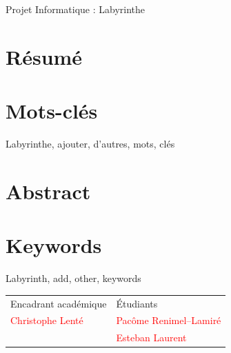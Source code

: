 \documentclass[12pt]{scrreprt} %
\begin{document}
\newpage

\begin{center}
    \Huge
    Projet Informatique : Labyrinthe
\end{center}

\section*{Résumé}

\blindtext

\section*{Mots-clés}

Labyrinthe, ajouter, d'autres, mots, clés

\section*{Abstract}
\blindtext

\section*{Keywords}

Labyrinth, add, other, keywords

\hrulefill

\vfill


\begin{table}[h]
    \begin{tabularx}{\textwidth}{|X|Y|}
        \hline
        Encadrant académique              & Étudiants                               \\
        \textcolor{red}{Christophe Lenté} & \textcolor{red}{Pacôme Renimel--Lamiré} \\
                                          & \textcolor{red}{Esteban Laurent}        \\
        \hline
    \end{tabularx}
\end{table}
\end{document}
